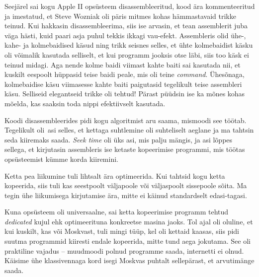 Seejärel sai kogu Apple II opsüsteem disassembleeritud, kood ära 
kommenteeritud ja imestatud, et Steve Wozniak oli päris mitmes kohas
hämmastavaid trikke teinud. 
Kui hakkasin disassembleerima, siis ise arvasin, et tean assemblerit juba 
väga hästi, kuid paari asja puhul tekkis ikkagi 
vau-efekt. Assembleris olid ühe-, kahe- ja 
kolmebaidised käsud ning trikk seisnes selles, et ühte kolmebaidist käsku oli võimalik 
kasutada selliselt, et kui programm jooksis otse läbi, siis too 
käsk ei teinud midagi. Aga nende kolme baidi viimast 
kahte baiti sai kasutada nii, et kuskilt eespoolt hüppasid teise 
baidi peale, mis oli teine \emph{command}. Ühesõnaga, kolmebaidise käsu 
viimasesse kahte baiti paigutasid tegelikult teise assembleri käsu. Selliseid
elegantseid trikke oli tehtud! Pärast püüdsin ise ka mõnes kohas mõelda, 
kas saaksin toda nippi efektiivselt kasutada.


Koodi disassembleerides pidi kogu 
algoritmist aru saama, mismoodi see töötab. Tegelikult oli asi selles, 
et kettaga suhtlemine oli suhteliselt aeglane ja ma tahtsin seda kiiremaks saada. 
\emph{Seek time} oli üks asi, mis palju mängis, ja asi lõppes sellega, et 
kirjutasin assembleris ise ketaste kopeerimise programmi, mis 
töötas opsüsteemist kümme korda kiiremini. 


Ketta pea liikumine tuli lihtsalt ära optimeerida. Kui tahtsid kogu ketta 
kopeerida, siis tuli kas seestpoolt väljapoole või 
väljaspoolt sissepoole sõita. Ma tegin ühe liikumisega kirjutamise ära, 
mitte ei käinud standardselt edasi-tagasi.


Kuna opsüsteem oli universaalne, sai ketta 
kopeerimise programm tehtud \emph{dedicated} kujul ehk optimeerituna 
konkreetse masina jaoks. Tol ajal oli oluline, et kui kuskilt, kas või 
Moskvast, tuli mingi tüüp, kel oli kettaid kaasas, siis pidi 
suutma programmid kiiresti endale kopeerida, mitte tund aega jokutama. See oli praktiline vajadus -- muudmoodi polnud programme saada, internetti ei olnud. Käisime 
ühe klassivennaga kord isegi Moskvas puhtalt sellepärast, et arvutimänge saada.

